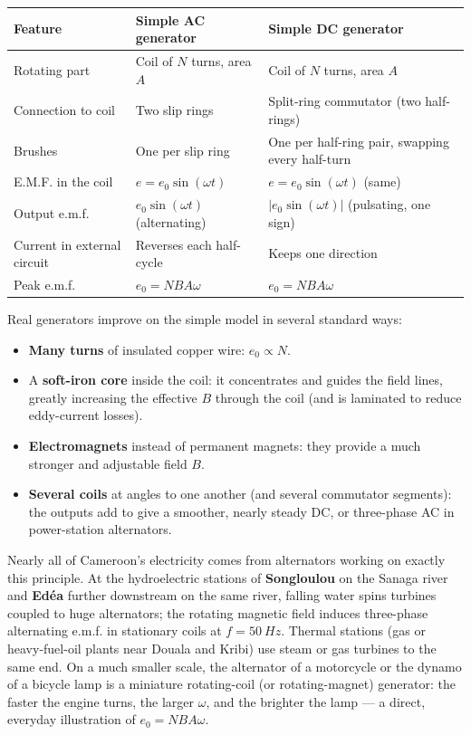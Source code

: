 \documentclass[11pt]{article}
\begin{document}
\begin{center}
\begin{tabularx}{\linewidth}{|l|X|X|}
\hline
\rowcolor{popblueL} \textbf{Feature} & \textbf{Simple AC generator} & \textbf{Simple DC generator} \\
\hline
Rotating part & Coil of $N$ turns, area $A$ & Coil of $N$ turns, area $A$ \\
\hline
Connection to coil & Two slip rings & Split-ring commutator (two half-rings) \\
\hline
Brushes & One per slip ring & One per half-ring pair, swapping every half-turn \\
\hline
E.M.F. in the coil & $e = e_0\sin(\omega t)$ & $e = e_0\sin(\omega t)$ (same) \\
\hline
Output e.m.f. & $e_0\sin(\omega t)$ (alternating) & $|e_0\sin(\omega t)|$ (pulsating, one sign) \\
\hline
Current in external circuit & Reverses each half-cycle & Keeps one direction \\
\hline
Peak e.m.f. & $e_0 = NBA\omega$ & $e_0 = NBA\omega$ \\
\hline
\end{tabularx}
\end{center}

Real generators improve on the simple model in several standard ways:
\begin{itemize}
\item \textbf{Many turns} of insulated copper wire: $e_0 \propto N$.
\item A \textbf{soft-iron core} inside the coil: it concentrates and guides the field lines, greatly increasing the effective $B$ through the coil (and is laminated to reduce eddy-current losses).
\item \textbf{Electromagnets} instead of permanent magnets: they provide a much stronger and adjustable field $B$.
\item \textbf{Several coils} at angles to one another (and several commutator segments): the outputs add to give a smoother, nearly steady DC, or three-phase AC in power-station alternators.
\end{itemize}

\begin{savaistu}
Nearly all of Cameroon's electricity comes from alternators working on exactly this principle. At the hydroelectric stations of \textbf{Songloulou} on the Sanaga river and \textbf{Edéa} further downstream on the same river, falling water spins turbines coupled to huge alternators; the rotating magnetic field induces three-phase alternating e.m.f. in stationary coils at $f = \SI{50}{Hz}$. Thermal stations (gas or heavy-fuel-oil plants near Douala and Kribi) use steam or gas turbines to the same end. On a much smaller scale, the alternator of a motorcycle or the dynamo of a bicycle lamp is a miniature rotating-coil (or rotating-magnet) generator: the faster the engine turns, the larger $\omega$, and the brighter the lamp --- a direct, everyday illustration of $e_0 = NBA\omega$.
\end{savaistu}
\end{document}
